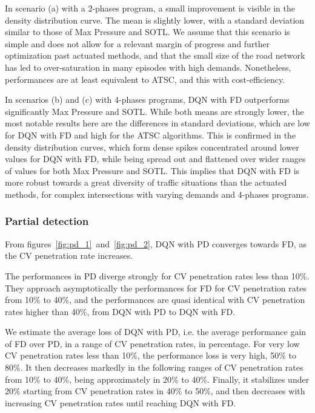\documentclass[journal]{IEEEtran}
\begin{document}
In scenario (a) with a 2-phases program, a small improvement is visible in the density distribution curve. The mean is slightly lower, with a standard deviation similar to those of Max Pressure and SOTL. We assume that this scenario is simple and does not allow for a relevant margin of progress and further optimization past actuated methods, and that the small size of the road network has led to over-saturation in many episodes with high demands. Nonetheless, performances are at least equivalent to ATSC, and this with cost-efficiency.

In scenarios (b) and (c) with 4-phases programs, DQN with FD outperforms significantly Max Pressure and SOTL. While both means are strongly lower, the most notable results here are the differences in standard deviations, which are low for DQN with FD and high for the ATSC algorithms. This is confirmed in the density distribution curves, which form dense spikes concentrated around lower values for DQN with FD, while being spread out and flattened over wider ranges of values for both Max Pressure and SOTL. This implies that DQN with FD is more robust towards a great diversity of traffic situations than the actuated methods, for complex intersections with varying demands and 4-phases programs.\\

\subsubsection{Partial detection}
From figures~\ref{fig:pd_1}~and~\ref{fig:pd_2}, DQN with PD converges towards FD, as the CV penetration rate increases. 

The performances in PD diverge strongly for CV penetration rates less than 10\%. They approach asymptotically the performances for FD for CV penetration rates from 10\% to 40\%, and the performances are quasi identical with CV penetration rates higher than 40\%, from DQN with PD to DQN with FD.

We estimate the average loss of DQN with PD, i.e. the average performance gain of FD over PD, in a range of CV penetration rates, in percentage. For very low CV penetration rates less than 10\%, the performance loss is very high, 50\% to 80\%. It then decreases markedly in the following ranges of CV penetration rates from 10\% to 40\%, being approximately in 20\% to 40\%. Finally, it stabilizes under 20\% starting from CV penetration rates in 40\% to 50\%, and then decreases with increasing CV penetration rates until reaching DQN with FD.
\end{document}

